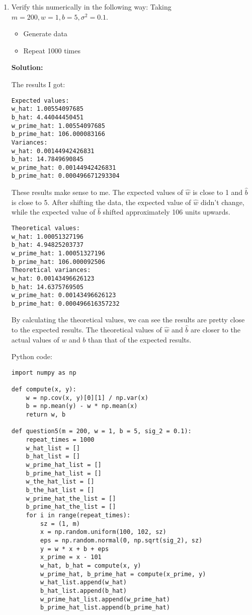 \documentclass[letter, 12pt]{article}
\begin{document}
\begin{enumerate}
    	\item{Verify this numerically in the following way: Taking $ m = 200, w = 1, b = 5, \sigma^2 = 0.1 $.}
    	\begin{itemize}
    		\item Generate data
    		\item Repeat 1000 times
    	\end{itemize}
    	\par{\textbf{Solution:}}
    	\par{The results I got:}
    	\begin{lstlisting}[backgroundcolor = \color{lightgray}]
Expected values:
w_hat: 1.00554097685
b_hat: 4.44044450451
w_prime_hat: 1.00554097685
b_prime_hat: 106.000083166
Variances:
w_hat: 0.00144942426831
b_hat: 14.7849690845
w_prime_hat: 0.00144942426831
b_prime_hat: 0.000496671293304
    	\end{lstlisting}
    	\par{These results make sense to me. The expected values of $ \hat{w} $ is close to 1 and $ \hat{b} $ is close to 5. After shifting the data, the expected value of $ \hat{w} $ didn't change, while the expected value of $ \hat{b} $ shifted approximately 106 units upwards.}
    	
    	\begin{lstlisting}[backgroundcolor = \color{lightgray}]
Theoretical values:
w_hat: 1.00051327196
b_hat: 4.94825203737
w_prime_hat: 1.00051327196
b_prime_hat: 106.000092506
Theoretical variances:
w_hat: 0.00143496626123
b_hat: 14.6375769505
w_prime_hat: 0.00143496626123
b_prime_hat: 0.000496616357232
    	\end{lstlisting}
    	\par{By calculating the theoretical values, we can see the results are pretty close to the expected results. The theoretical values of $ \hat{w} $ and $ \hat{b} $ are closer to the actual values of $ w $ and $ b $ than that of the expected results.}
    	
    	\par{Python code:}
    	\begin{verbatim}
import numpy as np

def compute(x, y):
    w = np.cov(x, y)[0][1] / np.var(x)
    b = np.mean(y) - w * np.mean(x)
    return w, b

def question5(m = 200, w = 1, b = 5, sig_2 = 0.1):
    repeat_times = 1000
    w_hat_list = []
    b_hat_list = []
    w_prime_hat_list = []
    b_prime_hat_list = []
    w_the_hat_list = []
    b_the_hat_list = []
    w_prime_hat_the_list = []
    b_prime_hat_the_list = []
    for i in range(repeat_times):
        sz = (1, m)
        x = np.random.uniform(100, 102, sz)
        eps = np.random.normal(0, np.sqrt(sig_2), sz)
        y = w * x + b + eps
        x_prime = x - 101
        w_hat, b_hat = compute(x, y)
        w_prime_hat, b_prime_hat = compute(x_prime, y)
        w_hat_list.append(w_hat)
        b_hat_list.append(b_hat)
        w_prime_hat_list.append(w_prime_hat)
        b_prime_hat_list.append(b_prime_hat)


\end{verbatim}
\end{enumerate}
\end{document}
